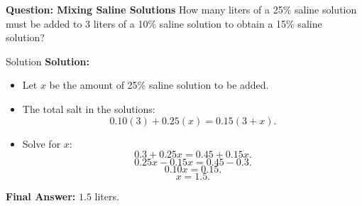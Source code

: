 \documentclass{beamer}
\begin{document}
\begin{frame}{\textbf{Question: Mixing Saline Solutions}}
    How many liters of a 25\% saline solution must be added to 3 liters of a 10\% saline solution to obtain a 15\% saline solution?


\end{frame}

\begin{frame}{Solution}
    \textbf{Solution:}
    \begin{itemize}
        \item Let \( x \) be the amount of 25\% saline solution to be added.
        \item The total salt in the solutions:
        \[
        0.10(3) + 0.25(x) = 0.15(3 + x).
        \]
        \item Solve for \( x \):
        \[
        0.3 + 0.25x = 0.45 + 0.15x.
        \]
        \[
        0.25x - 0.15x = 0.45 - 0.3.
        \]
        \[
        0.10x = 0.15.
        \]
        \[
        x = 1.5.
        \]
    \end{itemize}
    \textbf{Final Answer:} \(\boxed{1.5}\) liters.
    
\end{frame}

\begin{frame}
\end{frame}
\end{document}
